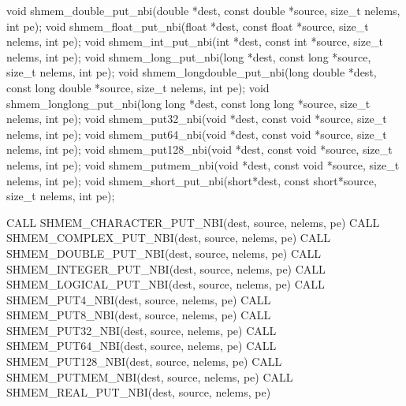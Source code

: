 \color{ForestGreen}

\begin{apidefinition}

\begin{Csynopsis}
void shmem_double_put_nbi(double *dest, const double *source, size_t nelems, int pe);
void shmem_float_put_nbi(float *dest, const float *source, size_t nelems, int pe);
void shmem_int_put_nbi(int *dest, const int *source, size_t nelems, int pe);
void shmem_long_put_nbi(long *dest, const long *source, size_t nelems, int pe);
void shmem_longdouble_put_nbi(long double *dest, const long double *source, size_t nelems, int pe);
void shmem_longlong_put_nbi(long long *dest, const long long *source, size_t nelems, int pe);
void shmem_put32_nbi(void *dest, const void *source, size_t nelems, int pe);
void shmem_put64_nbi(void *dest, const void *source, size_t nelems, int pe);
void shmem_put128_nbi(void *dest, const void *source, size_t nelems, int pe);
void shmem_putmem_nbi(void *dest, const void *source, size_t nelems, int pe);
void shmem_short_put_nbi(short*dest, const short*source, size_t nelems, int pe);
\end{Csynopsis}

\begin{Fsynopsis}
CALL SHMEM_CHARACTER_PUT_NBI(dest, source, nelems, pe)
CALL SHMEM_COMPLEX_PUT_NBI(dest, source, nelems, pe)
CALL SHMEM_DOUBLE_PUT_NBI(dest, source, nelems, pe)
CALL SHMEM_INTEGER_PUT_NBI(dest, source, nelems, pe)
CALL SHMEM_LOGICAL_PUT_NBI(dest, source, nelems, pe)
CALL SHMEM_PUT4_NBI(dest, source, nelems, pe)
CALL SHMEM_PUT8_NBI(dest, source, nelems, pe)
CALL SHMEM_PUT32_NBI(dest, source, nelems, pe)
CALL SHMEM_PUT64_NBI(dest, source, nelems, pe)
CALL SHMEM_PUT128_NBI(dest, source, nelems, pe)
CALL SHMEM_PUTMEM_NBI(dest, source, nelems, pe)
CALL SHMEM_REAL_PUT_NBI(dest, source, nelems, pe)
\end{Fsynopsis}

\begin{apiarguments}
\end{apiarguments}


\end{apidefinition}
